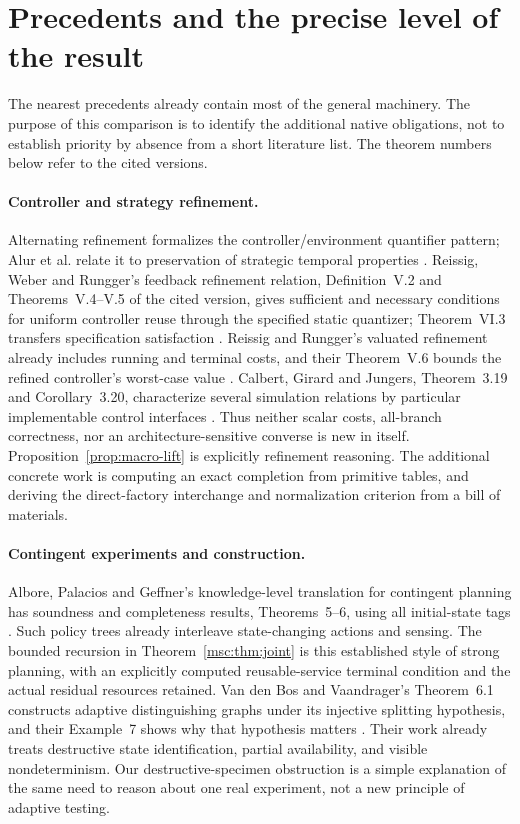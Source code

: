 \documentclass[11pt]{article}
\theoremstyle{definition}
\theoremstyle{remark}
\begin{document}
\section{Precedents and the precise level of the result}\label{sec:prior}
The nearest precedents already contain most of the general machinery.
The purpose of this comparison is to identify the additional native
obligations, not to establish priority by absence from a short literature
list. The theorem numbers below refer to the cited versions.

\paragraph{Controller and strategy refinement.}
Alternating refinement formalizes the controller/environment quantifier
pattern; Alur et al. relate it to preservation of strategic temporal
properties \cite{Alur1998}. Reissig, Weber and Rungger's feedback
refinement relation, Definition~V.2 and Theorems~V.4--V.5 of the cited
version, gives sufficient and necessary conditions for uniform controller
reuse through the specified static quantizer; Theorem~VI.3 transfers
specification satisfaction \cite{RWR2017}. Reissig and Rungger's valuated
refinement already includes running and terminal costs, and their
Theorem~V.6 bounds the refined controller's worst-case value
\cite{RR2019}. Calbert, Girard and Jungers, Theorem~3.19 and
Corollary~3.20, characterize several simulation relations by particular
implementable control interfaces \cite{CGJ2026}. Thus neither scalar
costs, all-branch correctness, nor an architecture-sensitive converse is
new in itself. Proposition~\ref{prop:macro-lift} is explicitly refinement
reasoning. The additional concrete work is computing an exact completion
from primitive tables, and deriving the direct-factory interchange and
normalization criterion from a bill of materials.

\paragraph{Contingent experiments and construction.}
Albore, Palacios and Geffner's knowledge-level translation for contingent
planning has soundness and completeness results, Theorems~5--6, using all
initial-state tags \cite{APG2009}. Such policy trees already interleave
state-changing actions and sensing. The bounded recursion in
Theorem~\ref{msc:thm:joint} is this established style of strong planning,
with an explicitly computed reusable-service terminal condition and the
actual residual resources retained. Van den Bos and Vaandrager's
Theorem~6.1 constructs adaptive distinguishing graphs under its injective
splitting hypothesis, and their Example~7 shows why that hypothesis
matters \cite{BV2019}. Their work already treats destructive state
identification, partial availability, and visible nondeterminism.
Our destructive-specimen obstruction is a simple explanation of the
same need to reason about one real experiment, not a new principle of
adaptive testing.
\end{document}
